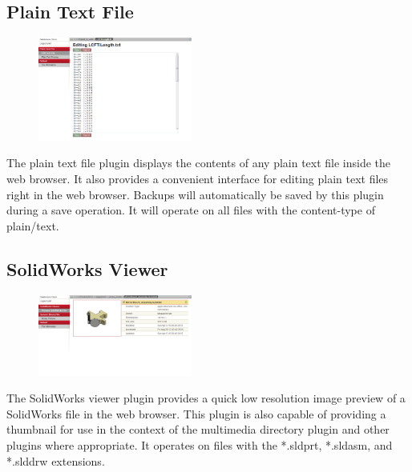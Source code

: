 \documentclass[10pt]{article}
\begin{document}
\endgroup

\hfill \break
\hfill \break
\hfill \break
\hfill \break
\hfill \break
\hfill \break
\hfill \break
\hfill \break
\hfill \break
\hfill \break
\hfill \break
\hfill \break
\hfill \break
\hfill \break

\begingroup
\setlength\intextsep{0pt}
\subsection{Plain Text File}
\begin{figure}
		\includegraphics[width=0.45\textwidth]{Plain_Text_File.png}
\end{figure}
The plain text file plugin displays the contents of any plain text file inside the web browser.  It also provides a convenient interface for editing plain text files right in the web browser.  Backups will automatically be saved by this plugin during a save operation.  It will operate on all files with the content-type of plain/text.

\endgroup

\hfill \break
\hfill \break
\hfill \break
\hfill \break
\hfill \break

\begingroup
\setlength\intextsep{0pt}
\subsection{SolidWorks Viewer}
\begin{figure}
		\includegraphics[width=0.45\textwidth]{SolidWorks_Viewer.png}
\end{figure}
The SolidWorks viewer plugin provides a quick low resolution image preview of a SolidWorks file in the web browser.  This plugin is also capable of providing a thumbnail for use in the context of the multimedia directory plugin and other plugins where appropriate.  It operates on files with the *.sldprt, *.sldasm, and *.slddrw extensions.
\end{document}
